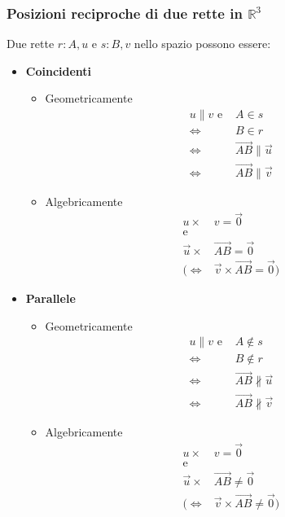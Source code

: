\documentclass[../main.tex]{subfiles}
\begin{document}
\subsubsection{Posizioni reciproche di due rette in $\mathbb{R}^3$}
Due rette $r: A,u$ e $s: B,v$ nello spazio possono essere:
\begin{itemize}
    \item \textbf{Coincidenti}
    \begin{itemize}
        \item Geometricamente \begin{align*}
            u \parallel v \text{ e }& A\in s \\
            \Leftrightarrow& B \in r \\
            \Leftrightarrow& \vec{AB} \parallel \vec{u} \\
            \Leftrightarrow& \vec{AB} \parallel \vec{v}
        \end{align*} 
        \item Algebricamente \begin{align*}
            u \times& v = \vec{0} \\
            \text{e} \\
            \vec{u} \times& \vec{AB} = \vec{0} \\
            (\Leftrightarrow&  \vec{v} \times \vec{AB} = \vec{0})
        \end{align*} 
    \end{itemize}
    \item \textbf{Parallele}
    \begin{itemize}
        \item Geometricamente \begin{align*}
            u \parallel v \text{ e }& A\notin s \\
            \Leftrightarrow& B \notin r \\
            \Leftrightarrow& \vec{AB} \nparallel \vec{u} \\
            \Leftrightarrow& \vec{AB} \nparallel \vec{v}
        \end{align*} 
        \item Algebricamente \begin{align*}
            u \times& v = \vec{0} \\
            \text{e} \\
            \vec{u} \times& \vec{AB} \neq \vec{0} \\
            (\Leftrightarrow&  \vec{v} \times \vec{AB} \neq \vec{0})
        \end{align*}

\end{itemize}
\end{itemize}
\end{document}
